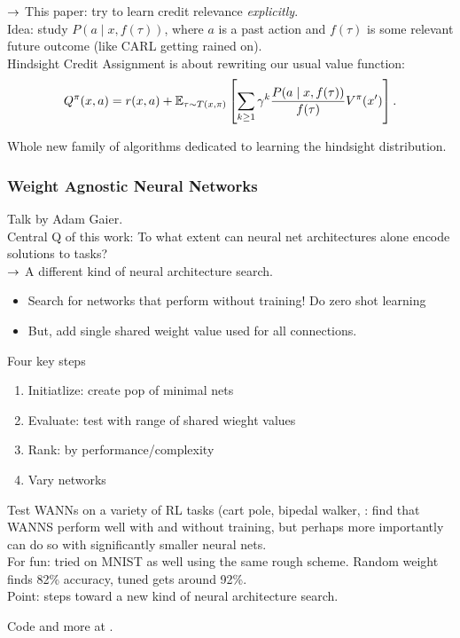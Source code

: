$\rightarrow$ This paper: try to learn credit relevance {\it explicitly}. \\

Idea: study $P(a \mid x, f(\tau))$, where $a$ is a past action and $f(\tau)$ is some relevant future outcome (like CARL getting rained on). \\

Hindsight Credit Assignment is about rewriting our usual value function:
\begin{equation}
    Q^\pi(x,a) = r(x,a) + \mathbb{E}_{\tau \sim T(x,\pi)} \left[\sum_{k \geq 1} \gamma^k \frac{P(a \mid x, f(\tau))}{f(\tau)}V^\pi(x')\right].
\end{equation}

Whole new family of algorithms dedicated to learning the hindsight distribution.

\subsubsection{Weight Agnostic Neural Networks}

Talk by Adam Gaier. \\

Central Q of this work: To what extent can neural net architectures alone encode solutions to tasks? \\

$\rightarrow$ A different kind of neural architecture search.
\begin{itemize}
    \item Search for networks that perform without training! Do zero shot learning
    \item But, add single shared weight value used for all connections.
\end{itemize}

Four key steps
\begin{enumerate}
    \item Initiatlize: create pop of minimal nets
    \item Evaluate: test with range of shared wieght values
    \item Rank: by performance/complexity
    \item Vary networks
\end{enumerate}

Test WANNs on a variety of RL tasks (cart pole, bipedal walker, : find that WANNS perform well with and without training, but perhaps more importantly can do so with significantly smaller neural nets. \\

For fun: tried on MNIST as well using the same rough scheme. Random weight finds 82\% accuracy, tuned gets around 92\%. \\

Point: steps toward a new kind of neural architecture search.

Code and more at .